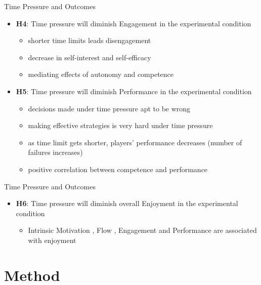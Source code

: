 \documentclass{beamer}
\begin{document}
\begin{frame}{Time Pressure and Outcomes}
\begin{itemize}
	\item \textbf{H4}: \alert{Time pressure will diminish Engagement} in the  experimental condition
		\begin{itemize}
			\item shorter time limits leads disengagement \cite{Lomas2013ChallengeOptimization}
			\item decrease in self-interest and self-efficacy
			\item mediating effects of autonomy and competence
		\end{itemize}
  \item \textbf{H5}: \alert{Time pressure will diminish Performance} in the  experimental condition
  \begin{itemize}
  		\item decisions made under time pressure apt to be wrong \cite{Linehan2009TimeDecisionMaking, Amabile2002Creativity, romero2013time}
  		\item making effective strategies is very hard under time pressure \cite{Locke1996ComplexGoalTime}
		\item as time limit gets shorter, players’ performance decreases (number of failures increases) \cite{Lomas2013ChallengeOptimization}
		\item positive correlation between competence and performance \cite{McEwan2012ControlDevice, Sheldon2008Manipulating}
	\end{itemize}
   \end{itemize}
\end{frame}

\begin{frame}{Time Pressure and Outcomes}
\begin{itemize}
	\item \textbf{H6}: \alert{Time pressure will diminish overall Enjoyment} in the  experimental condition
  		\begin{itemize}
  			\item Intrinsic Motivation \cite{PrzybylskiRigbyRyan2006MotivationPullofGames}, Flow \cite{Sweetser2005flow}, Engagement \cite{boyle2012engagement} and Performance \cite{trepte2011pleasures, klimmt2009player} are associated with enjoyment
		\end{itemize}
   \end{itemize}
\end{frame}

\section{Method}
\end{document}
